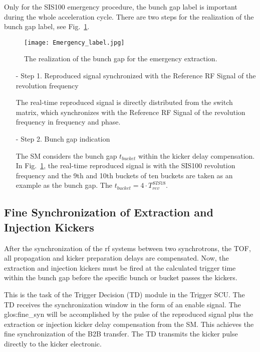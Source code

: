 \begin{itemize}
Only for the SIS100 emergency procedure, the bunch gap label is important during the whole acceleration cycle. There are two steps for the realization of the bunch gap label, see Fig.~\ref{Emergency_label}.
\begin{figure}[!htb]
   \centering   
   \texttt{[image: Emergency\_label.jpg]}
   \caption{The realization of the bunch gap for the emergency extraction.}
   \label{Emergency_label}
\end{figure} 

\begin{itemize}
\item[-] Step 1. Reproduced signal synchronized with the Reference RF Signal of the revolution frequency

The real-time reproduced signal is directly distributed from the switch matrix, which synchronizes with the Reference RF Signal of the revolution frequency in frequency and phase.
\item[-] Step 2. Bunch gap indication

The SM considers the bunch gap $t_{\mathit{bucket}}$ within the kicker delay compensation. In Fig.~\ref{Emergency_label}, the real-time reproduced signal is with the SIS100 revolution frequency and the 9th and 10th buckets of ten buckets are taken as an example as the bunch gap. The $t_{\mathit{bucket}}=4\cdot T_{\mathit{rev}}^{\mathit{SIS18}}$.

\end{itemize}

\end{itemize}

\subsection{Fine Synchronization of Extraction and Injection Kickers}
After the synchronization of the rf systems between two synchrotrons, the TOF, all propagation and kicker preparation delays are compensated. Now, the extraction and injection kickers must be fired at the calculated trigger time within the bunch gap before the specific bunch or bucket passes the kickers.
 
This is the task of the Trigger Decision (TD) module in the Trigger SCU. The TD receives the  synchronization window in the form of an enable signal. The \gls{glos:fine_syn} will be accomplished by the pulse of the reproduced signal plus the extraction or injection kicker delay compensation from the SM. This achieves the fine synchronization of the B2B transfer. The TD transmits the kicker pulse directly to the kicker electronic.  
 
